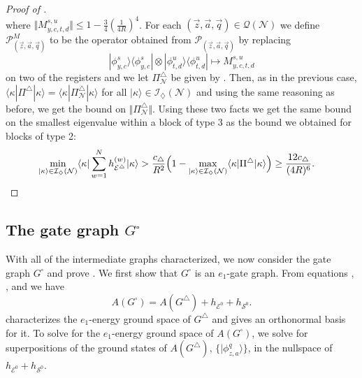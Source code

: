 \documentclass[../thesis-main/thesis-main]{subfiles}
\begin{document}
\begin{proof}[Proof of \protect{}]
\begin{equation}
\end{equation}
where $\Vert M_{y,c,t,d}^{s,u}\Vert \leq1-\frac{3}{4}\left(\frac{1}{4R}\right)^{4}$. For each $(\vec{z},\vec{a},\vec{q})\in\mathcal{Q}(\mathcal{N})$ we define $\mathcal{P}_{(\vec{z},\vec{a},\vec{q})}^{M}$ to be the operator obtained from $\mathcal{P}_{(\vec{z},\vec{a},\vec{q})}$ by replacing
\begin{equation}
|\phi_{y,c}^{s}\rangle\langle\phi_{y,c}^{s}|\otimes|\phi_{t,d}^{u}\rangle\langle\phi_{t,d}^{u}|\mapsto M_{y,c,t,d}^{s,u}
\end{equation}
on two of the registers and we let $\Pi_{\mathcal{N}}^{\triangle}$ be given by . Then, as in the previous case, $\langle\kappa|\Pi^{\triangle}|\kappa\rangle=\langle\kappa|\Pi_{\mathcal{N}}^{\triangle}|\kappa\rangle$ for all $|\kappa\rangle\in\mathcal{I}_{\diamondsuit}(\mathcal{N})$ and using the same reasoning as before, we get the bound  on $\Vert \Pi_{\mathcal{N}}^{\triangle}\Vert $. Using these two facts we get the same bound on the smallest eigenvalue within a block of type 3 as the bound we obtained for blocks of type 2:
\begin{align}
\min_{|\kappa\rangle\in\mathcal{I}_{\diamondsuit}(\mathcal{N})}\langle\kappa|\sum_{w=1}^{N}h_{\mathcal{E}^{\triangle}}^{(w)}|\kappa\rangle &>\frac{c_{\triangle}}{R^{2}}\Big(1-\max_{|\kappa\rangle\in\mathcal{I}_{\diamondsuit}(\mathcal{N})}\langle\kappa|\Pi^{\triangle}|\kappa\rangle\Big) \geq \frac{12c_{\triangle}}{(4R)^6}.\qedhere
\end{align}
\end{proof}

\subsection{The gate graph $G^{\square}$ }

With all of the intermediate graphs characterized, we now consider the gate graph $G^{\square}$ and prove . We first show that $G^{\square}$ is an $e_{1}$-gate graph. From equations , , and  we have
\begin{equation}
A(G^{\square})=A(G^{\triangle})+h_{\mathcal{E}^{0}}+h_{\mathcal{S}^{0}}.\label{eq:A_g_square_triangle}
\end{equation}
 characterizes the $e_{1}$-energy ground space of $G^{\triangle}$ and gives an orthonormal basis for it. To solve for the $e_{1}$-energy ground space of $A(G^{\square})$, we solve for superpositions of the ground states of $A(G^\triangle)$,  $\{|\phi_{z,a}^{q}\rangle\}$, in the nullspace of $h_{\mathcal{E}^{0}}+h_{\mathcal{S}^{0}}$.
\end{document}
